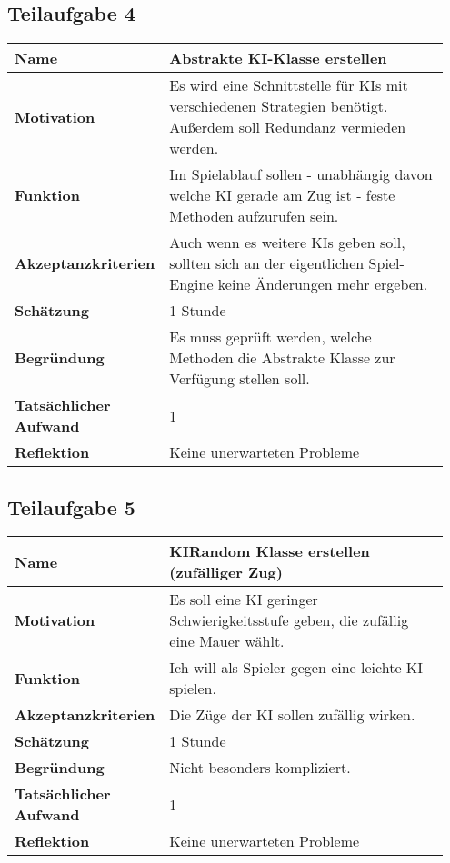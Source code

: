 \documentclass[a4paper,10pt]{article}
\begin{document}
\subsection*{Teilaufgabe 4}
\begin{tabular}{|p{0.25\linewidth}|p{0.7\linewidth}|}
\hline
 \textbf{Name} & Abstrakte KI-Klasse erstellen \\
 \hline
 \textbf{Motivation} & Es wird eine Schnittstelle für KIs mit verschiedenen Strategien benötigt. Außerdem soll Redundanz vermieden werden.\\
 \hline
 \textbf{Funktion} & Im Spielablauf sollen \-- unabhängig davon welche KI gerade am Zug ist \-- feste Methoden aufzurufen sein.\\
 \hline
 \textbf{Akzeptanzkriterien} & Auch wenn es weitere KIs geben soll, sollten sich an der eigentlichen Spiel-Engine keine Änderungen mehr ergeben.\\
 \hline
 \textbf{Schätzung} & 1 Stunde \\
 \hline
 \textbf{Begründung} & Es muss geprüft werden, welche Methoden die Abstrakte Klasse zur Verfügung stellen soll. \\
 \hline
 \textbf{Tatsächlicher Aufwand} & 1\\
 \hline
 \textbf{Reflektion} & Keine unerwarteten Probleme\\
 \hline
\end{tabular}
\subsection*{Teilaufgabe 5}
\begin{tabular}{|p{0.25\linewidth}|p{0.7\linewidth}|}
\hline
 \textbf{Name} & KIRandom Klasse erstellen (zufälliger Zug) \\
 \hline
 \textbf{Motivation} & Es soll eine KI geringer Schwierigkeitsstufe geben, die zufällig eine Mauer wählt.\\
 \hline
 \textbf{Funktion} & Ich will als Spieler gegen eine leichte KI spielen.\\
 \hline
 \textbf{Akzeptanzkriterien} & Die Züge der KI sollen zufällig wirken.\\
 \hline
 \textbf{Schätzung} & 1 Stunde \\
 \hline
 \textbf{Begründung} & Nicht besonders kompliziert. \\
 \hline
 \textbf{Tatsächlicher Aufwand} & 1\\
 \hline
 \textbf{Reflektion} & Keine unerwarteten Probleme\\
 \hline
\end{tabular}
\end{document}
